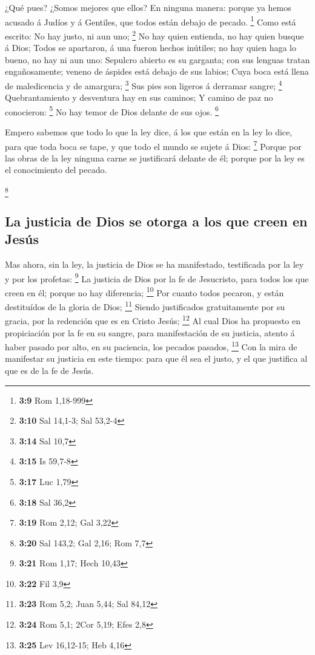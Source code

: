  ¿Qué pues? ¿Somos mejores que ellos? En ninguna manera:
porque ya hemos acusado á Judíos y á Gentiles, que todos están debajo de
pecado. \footnote{\textbf{3:9} Rom 1,18-999}  Como está
escrito: No hay justo, ni aun uno; \footnote{\textbf{3:10} Sal 14,1-3;
  Sal 53,2-4}  No hay quien entienda, no hay quien busque
á Dios;  Todos se apartaron, á una fueron hechos
inútiles; no hay quien haga lo bueno, no hay ni aun uno: 
Sepulcro abierto es su garganta; con sus lenguas tratan engañosamente;
veneno de áspides está debajo de sus labios;  Cuya boca
está llena de maledicencia y de amargura; \footnote{\textbf{3:14} Sal
  10,7}  Sus pies son ligeros á derramar sangre;
\footnote{\textbf{3:15} Is 59,7-8}  Quebrantamiento y
desventura hay en sus caminos;  Y camino de paz no
conocieron: \footnote{\textbf{3:17} Luc 1,79}  No hay
temor de Dios delante de sus ojos. \footnote{\textbf{3:18} Sal 36,2}

 Empero sabemos que todo lo que la ley dice, á los que
están en la ley lo dice, para que toda boca se tape, y que todo el mundo
se sujete á Dios: \footnote{\textbf{3:19} Rom 2,12; Gal 3,22}
 Porque por las obras de la ley ninguna carne se
justificará delante de él; porque por la ley es el conocimiento del
pecado.

\footnote{\textbf{3:20} Sal 143,2; Gal 2,16; Rom 7,7}

\hypertarget{la-justicia-de-dios-se-otorga-a-los-que-creen-en-jesuxfas}{%
\subsection{La justicia de Dios se otorga a los que creen en
Jesús}\label{la-justicia-de-dios-se-otorga-a-los-que-creen-en-jesuxfas}}

 Mas ahora, sin la ley, la justicia de Dios se ha
manifestado, testificada por la ley y por los profetas: \footnote{\textbf{3:21}
  Rom 1,17; Hech 10,43}  La justicia de Dios por la fe de
Jesucristo, para todos los que creen en él; porque no hay diferencia;
\footnote{\textbf{3:22} Fil 3,9}  Por cuanto todos
pecaron, y están destituídos de la gloria de Dios; \footnote{\textbf{3:23}
  Rom 5,2; Juan 5,44; Sal 84,12}  Siendo justificados
gratuitamente por su gracia, por la redención que es en Cristo Jesús;
\footnote{\textbf{3:24} Rom 5,1; 2Cor 5,19; Efes 2,8}  Al
cual Dios ha propuesto en propiciación por la fe en su sangre, para
manifestación de su justicia, atento á haber pasado por alto, en su
paciencia, los pecados pasados, \footnote{\textbf{3:25} Lev 16,12-15;
  Heb 4,16}  Con la mira de manifestar su justicia en
este tiempo: para que él sea el justo, y el que justifica al que es de
la fe de Jesús.

